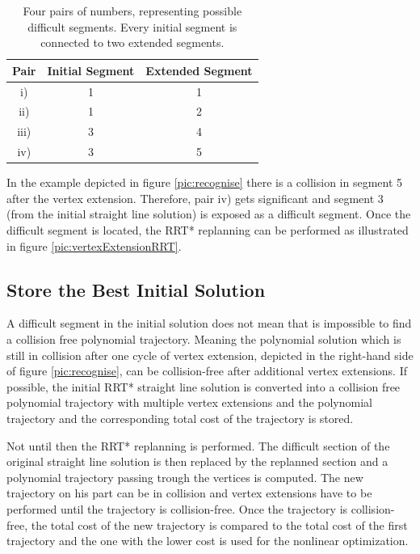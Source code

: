 \begin{table}[H] 
\begin{center}
    \begin{tabular}{| c | c | c | }
    \hline
    Pair & Initial Segment & Extended Segment\\ \hline
   i) & 1 & 1 \\ \hline
   ii) & 1 & 2\\ \hline
   iii) & 3 & 4\\ \hline
   iv) & 3 & 5\\
    \hline
    \end{tabular}
    \caption{Four pairs of numbers, representing possible difficult segments. Every initial segment is connected to two extended segments.}
    \label{tab:pairsOfNumbers}
\end{center}
\end{table}

In the example depicted in figure \ref{pic:recognise} there is a collision in segment 5 after the vertex extension. 
Therefore, pair iv) gets significant and segment 3 (from the initial straight line solution) is exposed as a difficult segment. Once the difficult segment is located, the RRT* replanning can be performed as illustrated in figure \ref{pic:vertexExtensionRRT}.

\subsection{Store the Best Initial Solution}

A difficult segment in the initial solution does not mean that is impossible to find a collision free polynomial trajectory. Meaning the polynomial solution which is still in collision after one cycle of vertex extension, depicted in the right-hand side of figure \ref{pic:recognise}, can be collision-free after additional vertex extensions. If possible, the initial RRT* straight line solution is converted into a collision free polynomial trajectory with multiple vertex extensions and the polynomial trajectory and the corresponding total cost of the trajectory is stored. \newline

Not until then the RRT* replanning is performed. The difficult section of the original straight line solution is then replaced by the replanned section and a polynomial trajectory passing trough the vertices is computed. The new trajectory on his part can be in collision and vertex extensions have to be performed until the trajectory is collision-free. Once the trajectory is collision-free, the total cost of the new trajectory is compared to the total cost of the first trajectory and the one with the lower cost is used for the nonlinear optimization.

